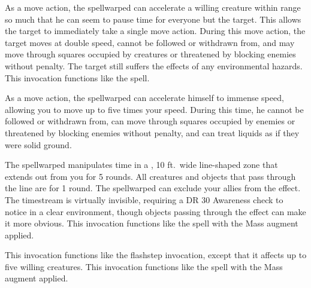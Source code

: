             As a move action, the spellwarped can accelerate a willing creature within \rngclose range so much that he can seem to pause time for everyone but the target.
            This allows the target to immediately take a single move action.
            During this move action, the target moves at double speed, cannot be followed or withdrawn from, and may move through squares occupied by creatures or threatened by blocking enemies without penalty.
            The target still suffers the effects of any environmental hazards.
            This invocation functions like the  spell.

            As a move action, the spellwarped can accelerate himself to immense speed, allowing you to move up to five times your speed.
            During this time, he cannot be followed or withdrawn from, can move through squares occupied by enemies or threatened by blocking enemies without penalty, and can treat liquids as if they were solid ground.

            The spellwarped manipulates time in a \arealarge, 10 ft.\ wide line-shaped zone that extends out from you for 5 rounds.
            All creatures and objects that pass through the line are \slowed for 1 round.
            The spellwarped can exclude your allies from the effect.
            The timestream is virtually invisible, requiring a DR 30 Awareness check to notice in a clear environment, though objects passing through the effect can make it more obvious.
            This invocation functions like the  spell with the Mass augment applied.

            This invocation functions like the flashstep invocation, except that it affects up to five willing creatures.
            This invocation functions like the  spell with the Mass augment applied.

